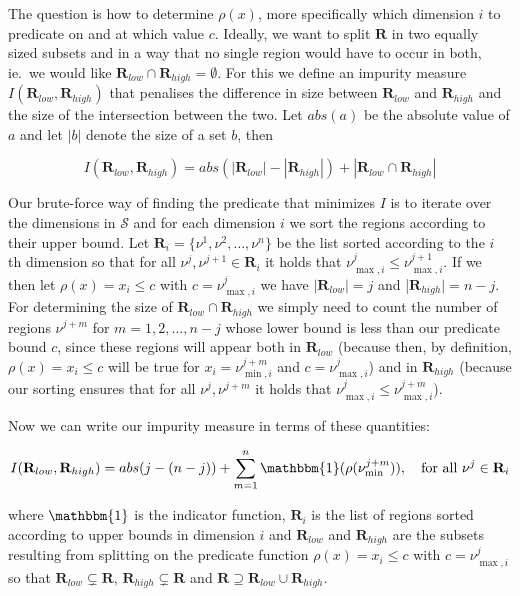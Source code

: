 The question is how to determine $\rho(x)$, more specifically which dimension
$i$ to predicate on and at which value $c$. Ideally, we want to split
$\mathbf{R}$ in two equally sized subsets and in a way that no single region
would have to occur in both, ie.\ we would like $\mathbf{R}_{low} \cap
\mathbf{R}_{high} = \emptyset$. For this we define an impurity measure
$I(\mathbf{R}_{low},\mathbf{R}_{high})$ that penalises the difference in size
between $\mathbf{R}_{low}$ and $\mathbf{R}_{high}$ and the size of the
intersection between the two. Let $abs(a)$ be the absolute value of $a$ and let
$|b|$ denote the size of a set $b$, then

\[
    I(\mathbf{R}_{low}, \mathbf{R}_{high})  = abs(|\mathbf{R}_{low}| -
    |\mathbf{R}_{high}|) + |\mathbf{R}_{low} \cap \mathbf{R}_{high}|
\]


Our brute-force way of finding the predicate that minimizes $I$ is to iterate
over the dimensions in $\mathcal{S}$ and for each dimension $i$ we sort the
regions according to their upper bound. Let $\mathbf{R}_i = \{ \nu^1, \nu^2,
\ldots, \nu^n \}$ be the list sorted according to the $i$ th dimension so that
for all $\nu^j, \nu^{j+1} \in \mathbf{R}_{i}$ it holds that $\nu^{j}_{\max,i} \le
\nu^{j+1}_{\max,i}$. If we then let $\rho(x) = x_i \le c$ with $c =
\nu^{j}_{\max,i}$ we have $|\mathbf{R}_{low}| = j$ and |$\mathbf{R}_{high}| = n
- j$. For determining the size of $\mathbf{R}_{low} \cap \mathbf{R}_{high}$ we
simply need to count the number of regions $\nu^{j+m}$ for $m = 1, 2, \ldots,
n-j$ whose lower bound is less than our predicate bound $c$, since these regions
will appear both in $\mathbf{R}_{low}$ (because then, by definition, $\rho(x) = x_i
\le c$ will be true for $x_i = \nu^{j+m}_{\min,i}$ and $c = \nu^{j}_{\max,i}$)
and in $\mathbf{R}_{high}$ (because our sorting ensures that for all
$\nu^{j},\nu^{j+m}$ it holds that $\nu^{j}_{\max,i} \le \nu^{j+m}_{\max,i}$).

Now we can write our impurity measure in terms of these quantities:

\[
    I(\mathbf{R}_{low}, \mathbf{R}_{high}) = abs(j - (n - j)) +
    \sum^{n}_{m=1} \mathbbm{1}(\rho(\nu^{j+m}_{\min})), \quad
    \text{for all }\nu^{j} \in \mathbf{R}_{i}
\] 

\noindent
where $\mathbbm{1}$ is the indicator function, $\mathbf{R}_{i}$ is the list of
regions sorted according to upper bounds in dimension $i$ and $\mathbf{R}_{low}$ and
$\mathbf{R}_{high}$ are the subsets resulting from splitting on the predicate
function $\rho(x) = x_i \le c$ with $c = \nu^{j}_{\max,i}$ so that
$\mathbf{R}_{low} \subsetneq \mathbf{R}$, $\mathbf{R}_{high} \subsetneq
\mathbf{R}$ and $\mathbf{R} \supseteq \mathbf{R}_{low} \cup \mathbf{R}_{high}$.

